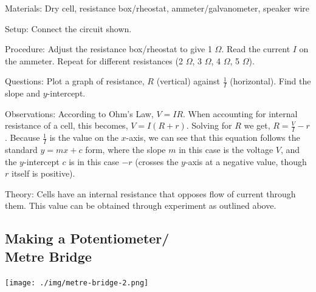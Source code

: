 \begin{multicols}{2}
\begin{description*}
\item[Materials:]{Dry cell, resistance box/rheostat, ammeter/galvanometer, speaker wire}
\item[Setup:]{Connect the circuit shown.}
\item[Procedure:]{Adjust the resistance box/rheostat to give 1 $\Omega$. Read the current $I$ on the ammeter. Repeat for different resistances (2 $\Omega$, 3 $\Omega$, 4 $\Omega$, 5 $\Omega$).}
\item[Questions:]{Plot a graph of resistance, $R$ (vertical) against $\frac{1}{I}$ (horizontal). Find the slope and $y$-intercept.}
\item[Observations:]{According to Ohm's Law, $V = IR$. When accounting for internal resistance of a cell, this becomes, $V = I(R + r)$. Solving for $R$ we get, $R = \frac{V}{I} - r$. Because $\frac{1}{I}$ is the value on the $x$-axis, we can see that this equation follows the standard $y=mx+c$ form, where the slope $m$ in this case is the voltage $V$, and the $y$-intercept $c$ is in this case $-r$ (crosses the $y$-axis at a negative value, though $r$ itself is positive).}
\item[Theory:]{Cells have an internal resistance that opposes flow of current through them. This value can be obtained through experiment as outlined above.}
\end{description*}

\vfill
\columnbreak

\subsection[Making a Potentiometer/Metre Bridge]{Making a Potentiometer/ \hfill \\ Metre Bridge}

\begin{center}
\texttt{[image: ./img/metre-bridge-2.png]}
\end{center}


\end{multicols}
